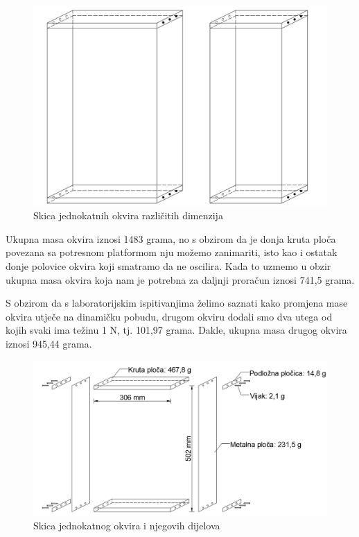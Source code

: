 \documentclass[12pt]{book}
\begin{document}
\begin{figure}[H]
	\centering
	\includegraphics[width=0.7\linewidth]{Slike/2_okvira_skica}
	\caption{Skica jednokatnih okvira različitih dimenzija}
	\label{fig:2okviraskica}
\end{figure}


Ukupna masa okvira iznosi 1483 grama, no s obzirom da je donja kruta ploča povezana sa potresnom platformom nju možemo zanimariti, isto kao i ostatak donje polovice okvira koji smatramo da ne oscilira. Kada to uzmemo u obzir ukupna masa okvira koja nam je potrebna za daljnji proračun iznosi 741,5 grama. 

S obzirom da s laboratorijskim ispitivanjima želimo saznati kako promjena mase okvira utječe na dinamičku pobudu, drugom okviru dodali smo dva utega od kojih svaki ima težinu 1 N, tj. 101,97 grama. Dakle, ukupna masa drugog okvira iznosi 945,44 grama.

\begin{figure}[H]
	\centering
	\includegraphics[width=0.8\linewidth]{Slike/okvir_skica}
	\caption{Skica jednokatnog okvira i njegovih dijelova}
	\label{fig:okvirskica}
\end{figure}
\end{document}
